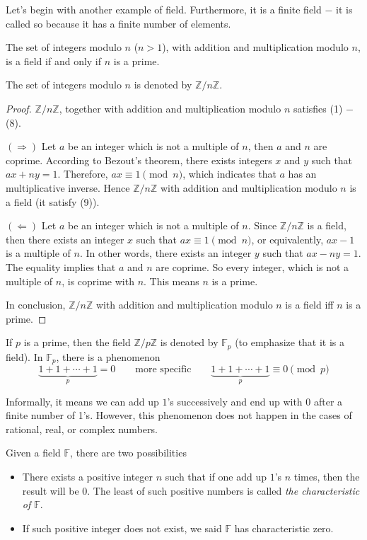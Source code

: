 Let's begin with another example of field. Furthermore, it is a finite field $-$ it is called so because it has a finite number of elements.

\begin{theorem}
	The set of integers modulo $n$ ($n > 1$), with addition and multiplication modulo $n$, is a field if and only if $n$ is a prime.
\end{theorem}

The set of integers modulo $n$ is denoted by $\mathbb{Z}/n\mathbb{Z}$.

\begin{proof}
	$\mathbb{Z}/n\mathbb{Z}$, together with addition and multiplication modulo $n$ satisfies (1) $-$ (8).

	$(\Rightarrow)$ Let $a$ be an integer which is not a multiple of $n$, then $a$ and $n$ are coprime. According to Bezout's theorem, there exists integers $x$ and $y$ such that $ax + ny = 1$. Therefore, $ax\equiv 1\pmod{n}$, which indicates that $a$ has an multiplicative inverse. Hence $\mathbb{Z}/n\mathbb{Z}$ with addition and multiplication modulo $n$ is a field (it satisfy (9)).

	$(\Leftarrow)$ Let $a$ be an integer which is not a multiple of $n$. Since $\mathbb{Z}/n\mathbb{Z}$ is a field, then there exists an integer $x$ such that $ax\equiv 1\pmod{n}$, or equivalently, $ax - 1$ is a multiple of $n$. In other words, there exists an integer $y$ such that $ax - ny = 1$. The equality implies that $a$ and $n$ are coprime. So every integer, which is not a multiple of $n$, is coprime with $n$. This means $n$ is a prime.

	In conclusion, $\mathbb{Z}/n\mathbb{Z}$ with addition and multiplication modulo $n$ is a field iff $n$ is a prime.
\end{proof}

If $p$ is a prime, then the field $\mathbb{Z}/p\mathbb{Z}$ is denoted by $\mathbb{F}_{p}$ (to emphasize that it is a field). In $\mathbb{F}_{p}$, there is a phenomenon
\[
	\underbrace{1 + 1 + \cdots + 1}_{p} = 0 \qquad \text{more specific}\qquad \underbrace{1 + 1 + \cdots + 1}_{p} \equiv 0\pmod{p}
\]

Informally, it means we can add up $1$'s successively and end up with $0$ after a finite number of 1's. However, this phenomenon does not happen in the cases of rational, real, or complex numbers.

\begin{definition}
	Given a field $\mathbb{F}$, there are two possibilities
	\begin{itemize}
		\item There exists a positive integer $n$ such that if one add up $1$'s $n$ times, then the result will be $0$. The least of such positive numbers is called \textit{the characteristic of $\mathbb{F}$}.
		\item If such positive integer does not exist, we said $\mathbb{F}$ has characteristic zero.
	\end{itemize}
\end{definition}

